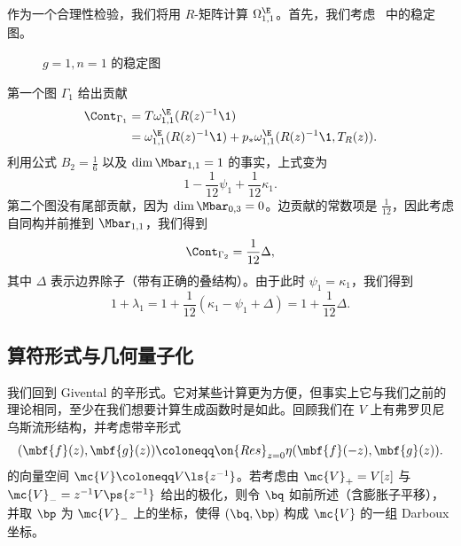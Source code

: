 \begin{exm}
    作为一个合理性检验，我们将用 $R$-矩阵计算 $\Omega_{1,1}^{\E}$。首先，我们考虑~ 中的稳定图。
    \begin{figure}[htpb]
    \begin{center}
    \end{center}
    \caption{$g=1, n=1$ 的稳定图}%
    \label{fig:03graphloop}
    \end{figure}
    第一个图 $\Gamma_1$ 给出贡献
    \begin{align*}
        \Cont_{\Gamma_1} &= T\omega_{1,1}^{\E}(R(z)^{-1}\1) \\
        &= \omega_{1,1}^{\E}(R(z)^{-1}\1) + p_* \omega_{1,1}^{\E}(R(z)^{-1}\1, T_R(z)).
    \end{align*}
    利用公式 $B_2 = \frac{1}{6}$ 以及 $\dim \Mbar_{1,1} = 1$ 的事实，上式变为
    \[ 1 - \frac{1}{12}\psi_1 + \frac{1}{12} \kappa_1. \]
    第二个图没有尾部贡献，因为 $\dim \Mbar_{0,3} = 0$。边贡献的常数项是 $\frac{1}{12}$，因此考虑自同构并前推到 $\Mbar_{1,1}$，我们得到
    \[ \Cont_{\Gamma_2} = \frac{1}{12} \Delta, \]
    其中 $\Delta$ 表示边界除子（带有正确的叠结构）。由于此时 $\psi_1 = \kappa_1$，我们得到
    \[ 1+\lambda_1 = 1 + \frac{1}{12}(\kappa_1 - \psi_1 + \Delta) = 1 + \frac{1}{12} \Delta. \]
\end{exm}




\subsection{算符形式与几何量子化}%
\label{sub:Operator formalism and geometric quantization}

我们回到 Givental 的辛形式。它对某些计算更为方便，但事实上它与我们之前的理论相同，至少在我们想要计算生成函数时是如此。回顾我们在 $V$ 上有弗罗贝尼乌斯流形结构，并考虑带辛形式
\[ (\mbf{f}(z), \mbf{g}(z)) \coloneqq \on{Res}_{z=0} \eta(\mbf{f}(-z), \mbf{g}(z)). \]
的向量空间 $\mc{V}\coloneqq V\ls{z^{-1}}$。若考虑由 $\mc{V}_+ = V[z]$ 与 $\mc{V}_- = z^{-1}V\ps{z^{-1}}$ 给出的极化，则令 $\bq$ 如前所述（含膨胀子平移），并取 $\bp$ 为 $\mc{V}_-$ 上的坐标，使得 $(\bq, \bp)$ 构成 $\mc{V}$ 的一组 Darboux 坐标。


